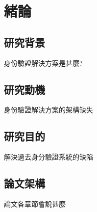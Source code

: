 
\chapter{緒論}

\section{研究背景}

身份驗證解決方案是甚麼?\newpage

\section{研究動機}

身份驗證解決方案的架構缺失\newpage

\section{研究目的}

解決過去身分驗證系統的缺陷\newpage

\section{論文架構}

論文各章節會說甚麼
